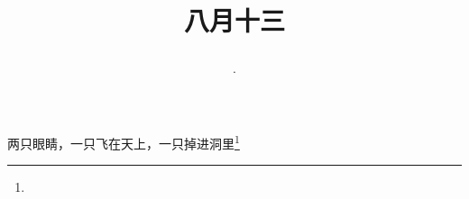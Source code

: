 \title{\date[d=15,m=9,y=2024][year:cn-y,年,month:cn,day:cn,日,·,weekday]·八月十三 }
两只眼睛，一只飞在天上，一只掉进洞里\footnote{ }

